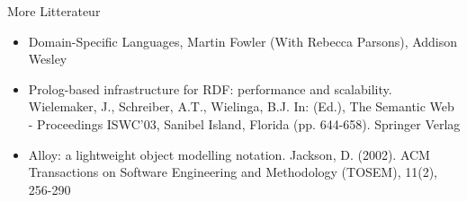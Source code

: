 \documentclass[slidetop,mathserif,red]{beamer}
\begin{document}
\begin{frame}{More Litterateur}
    \begin{itemize}
  

    \item Domain-Specific Languages, Martin Fowler (With Rebecca Parsons), Addison Wesley
    
    \item Prolog-based infrastructure for RDF: performance and scalability. Wielemaker, J., Schreiber, A.T., Wielinga, B.J.
In: (Ed.), The Semantic Web - Proceedings ISWC'03, Sanibel Island, Florida (pp. 644-658). Springer Verlag

	\item Alloy: a lightweight object modelling notation. Jackson, D. (2002). ACM Transactions on Software Engineering and Methodology (TOSEM), 11(2), 256-290  
  \end{itemize}
  \end{frame}



\end{document}
